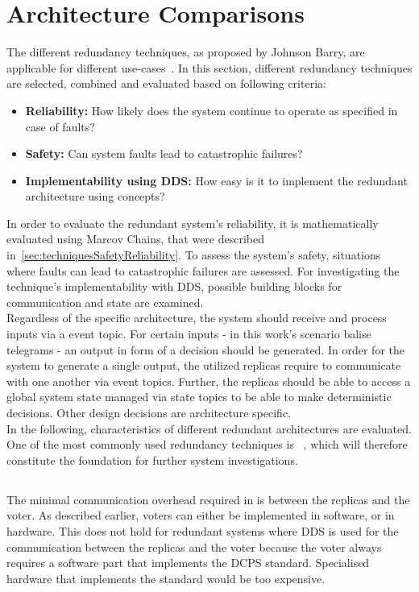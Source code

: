 \section{Architecture Comparisons}
The different redundancy techniques, as proposed by Johnson Barry, are applicable for different use-cases~\cite{BarryFaultToleranceAnalysis}.
In this section, different redundancy techniques are selected, combined and evaluated based on following criteria:

\begin{itemize}
\item \textbf{Reliability:} How likely does the system continue to operate as specified in case of faults?
\item \textbf{Safety:} Can system faults lead to catastrophic failures?
\item \textbf{Implementability using \gls*{DDS}:} How easy is it to implement the redundant architecture using  concepts?
\end{itemize}

In order to evaluate the redundant system's reliability, it is mathematically evaluated using Marcov Chains, that were described in~\autoref{sec:techniquesSafetyReliability}.
To assess the system's safety, situations where faults can lead to catastrophic failures are assessed. 
For investigating the technique's implementability with \gls*{DDS}, possible  building blocks for communication and state are examined.
\\

Regardless of the specific architecture, the system should receive and process inputs via a  event topic.
For certain inputs - in this work's scenario balise telegrams - an output in form of a decision should be generated.
In order for the system to generate a single output, the utilized replicas require to communicate with one another via  event topics.
Further, the replicas should be able to access a global system state managed via  state topics to be able to make deterministic decisions.
Other design decisions are architecture specific.
\\

In the following, characteristics of different redundant architectures are evaluated.
One of the most commonly used redundancy techniques is ~\cite{FaultToleranceViaNMR}, which will therefore constitute the foundation for further system investigations.

\subsection{}
The minimal communication overhead required in  is between the replicas and the voter.
As described earlier, voters can either be implemented in software, or in hardware.
This does not hold for redundant systems where \gls*{DDS} is used for the communication between the replicas and the voter because the voter always requires a software part that implements the \gls*{DCPS} standard.
Specialised hardware that implements the  standard would be too expensive.
\\


